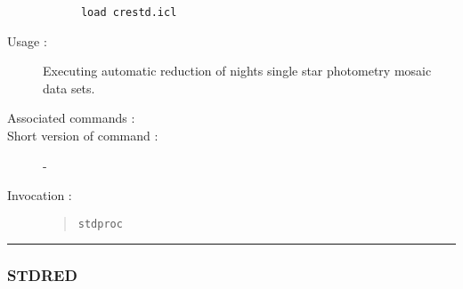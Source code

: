 \begin{description}
\begin{verbatim}
      load crestd.icl
\end{verbatim}

\item[Usage :] Executing automatic reduction of nights single star photometry
mosaic data sets.
\item[Associated commands :] {\tt {}}
\item[Short version of command :] -
\item[Invocation :]

\begin{quote}{\tt  stdproc }\end{quote}

\end{description}

\hrule
\subsubsection*{\label{STDRED}STDRED}

